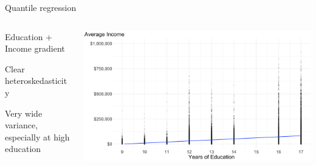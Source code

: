 \documentclass[notes,11pt, aspectratio=169]{beamer}
\newenvironment{wideitemize}{\itemize\addtolength{\itemsep}{10pt}}{\enditemize}
\begin{document}
\begin{frame}{Quantile regression}
  \begin{columns}[T] %
    \begin{column}{.3\textwidth}
  \begin{wideitemize}
    \item Education + Income  gradient
    \item Clear heteroskedasticity
    \item Very wide variance, especially at high education
  \end{wideitemize}
  \end{column}%
  \hfill%
  \begin{column}{.7\textwidth}
    \includegraphics[width=\linewidth]{avg_income_education_scatter_ols.png}
  \end{column}
\end{columns}
\end{frame}
\end{document}
